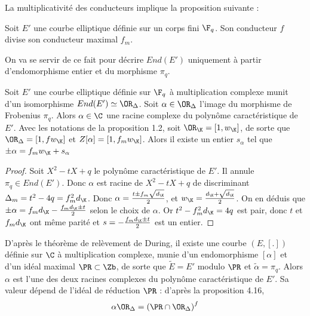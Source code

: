 La multiplicativité des conducteurs implique la proposition suivante :

\begin{Prop}
	Soit $E'$ une courbe elliptique définie sur un corps fini $\F_{q}$. Son conducteur $f$ divise son conducteur maximal $f_{m}$.
\end{Prop}

On va se servir de ce fait pour décrire $End(E')$ uniquement à partir d'endomorphisme entier et du morphisme $\pi_{q}$.

\begin{Prop}
	Soit $E'$ une courbe elliptique définie sur $\F_{q}$ à multiplication complexe munit d'un isomorphisme $End(E')\simeq\OR_{\Delta}$. Soit $\alpha\in\OR_{\Delta}$ l'image du morphisme de Frobenius $\pi_{q}$.
	Alors $\alpha\in\C$ une racine complexe du polynôme caractéristique de $E'$. Avec les notations de la proposition 1.2, soit $\OR_{\K} = \left[ 1, w_{\K}\right] $, de sorte que $\OR_{\Delta} = \left[ 1, fw_{\K}\right] $ et $Z[\alpha] = \left[ 1, f_{m}w_{\K}\right] $. Alors il existe un entier $s_{\alpha}$ tel que $\pm\alpha = f_{m}w_{\K} + s_{\alpha}$
	
\end{Prop}

\begin{proof}
	Soit $X^{2} - tX + q$ le polynôme caractéristique de $E'$. Il annule $\pi_{q}\in End(E')$. Donc $\alpha$ est racine de $X^{2} - tX + q$ de discriminant $\Delta_{m} = t^{2} - 4q = f_{m}^{2}d_{\K}$. Donc $\alpha = \frac{t\pm f_{m}\sqrt{d_{\K}}}{2}$, et $w_{\K} = \frac{d_{\K} + \sqrt{d_{\K}}}{2}$. On en déduis que  $\pm\alpha = f_{m}d_{\K} - \frac{f_{m}d_{\K} \pm t}{2}$ selon le choix de $\alpha$. Or $t^{2} - f_{m}^{2}d_{\K} = 4q$ est pair, donc $t$ et $f_{m}d_{\K}$ ont même parité et $s = -\frac{f_{m}d_{\K} \pm t}{2}$ est un entier.
	
\end{proof}

\begin{Rem}
	D'après le théorème de relèvement de During, il existe une courbe $\left( E,\left[ .\right] \right) $ définie sur $\C$ à multiplication complexe, munie d'un endomorphisme $\left[ \alpha\right] $ et d'un idéal maximal $\PR\subset\Zb$, de sorte que $\tilde{E} = E'$ modulo $\PR$ et $\tilde{\alpha} = \pi_{q}$. Alors $\alpha$ est l'une des deux racines complexes du polynôme caractéristique de $E'$. Sa valeur dépend de l'idéal de réduction $\PR$ : d'après la proposition 4.16, 
	\begin{equation*}
		\alpha\OR_{\Delta} = \left(\PR\cap\OR_{\Delta} \right) ^{f}
	\end{equation*} 
\end{Rem}

